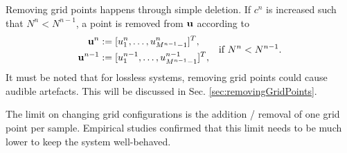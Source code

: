 \documentclass[fleqn]{jaes}
\begin{document}
Removing grid points happens through simple deletion. If $c^n$ is increased such that $N^n < N^{n-1}$, a point is removed from $\mathbf{u}$ according to
\begin{equation}\label{eq:removePoint}
\begin{aligned}
    \u^n &:= [u_1^n, \hdots, u_{M^{n-1}-1}^n]^T,\\
    \u^{n-1} &:= [u_1^{n-1}, \hdots, u_{M^{n-1}-1}^{n-1}]^T,
    \end{aligned} \quad \text{if } N^n < N^{n-1}.
\end{equation}
It must be noted that for lossless systems, removing grid points could cause audible artefacts. This will be discussed in Sec. \ref{sec:removingGridPoints}.

The limit on changing grid configurations is the addition / removal of one grid point per sample. Empirical studies confirmed that this limit needs to be much lower to keep the system well-behaved. %
\end{document}
